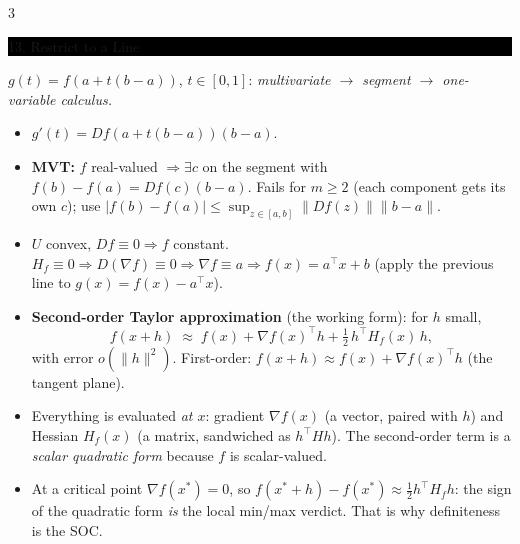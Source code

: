 \documentclass[8pt,letterpaper]{article}
\makeatletter
\newcommand{\sect}[1]{%
  \vspace{2.2pt}%
  \noindent\colorbox{black}{\parbox{\dimexpr\linewidth-2\fboxsep}{%
    \color{white}\bfseries\scshape\fontsize{6.4}{7.4}\selectfont
    \hyphenpenalty=10000\exhyphenpenalty=10000\raggedright #1}}%
  \vspace{1.4pt}\par\nopagebreak\@afterheading}
\newenvironment{tl}
  {\begin{itemize}[leftmargin=6pt,itemsep=0.3pt,topsep=1pt,parsep=0pt,
                   partopsep=0pt,label=\textcolor{gray}{\tiny$\bullet$}]}
  {\end{itemize}}
\newcommand{\Dd}{D}
\newcommand{\tp}{^{\!\top}}
\newcommand{\nm}[1]{\lVert #1\rVert}
\makeatother
\begin{document}
\begin{multicols}{3}
\sect{13. Restrict to a Line}
$g(t)=f(a+t(b-a))$, $t\in[0,1]$: \emph{multivariate $\to$ segment $\to$ one-variable calculus.}
\begin{tl}
\item $g'(t)=\Dd f(a+t(b-a))(b-a)$.
\item \textbf{MVT:} $f$ real-valued $\Rightarrow\exists c$ on the segment with $f(b)-f(a)=\Dd f(c)(b-a)$. \colorbox{black!12}{Fails for $m\ge2$} (each component gets its own $c$); use $|f(b)-f(a)|\le\sup_{z\in[a,b]}\nm{\Dd f(z)}\nm{b-a}$.
\item $U$ convex, $\Dd f\equiv0\Rightarrow f$ constant. $H_f\equiv0\Rightarrow\Dd(\nabla f)\equiv0\Rightarrow\nabla f\equiv a\Rightarrow f(x)=a\tp x+b$ (apply the previous line to $g(x)=f(x)-a\tp x$).
\item \textbf{Second-order Taylor approximation} (the working form): for $h$ small,
\[ f(x+h)\;\approx\; f(x)+\nabla f(x)\tp h+\tfrac12\,h\tp H_f(x)\,h, \]
with error $o(\nm{h}^2)$. First-order: $f(x+h)\approx f(x)+\nabla f(x)\tp h$ (the tangent plane).
\item Everything is evaluated \emph{at $x$}: gradient $\nabla f(x)$ (a vector, paired with $h$) and Hessian $H_f(x)$ (a matrix, sandwiched as $h\tp H h$). The second-order term is a \emph{scalar quadratic form} because $f$ is scalar-valued.
\item At a critical point $\nabla f(x^*)=0$, so $f(x^*+h)-f(x^*)\approx\frac12h\tp H_fh$: the sign of the quadratic form \emph{is} the local min/max verdict. That is why definiteness is the SOC.
\end{tl}


\end{multicols}
\end{document}
